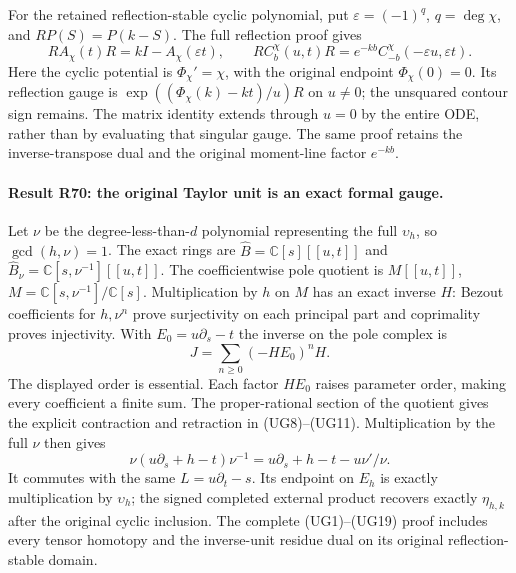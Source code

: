 For the retained reflection-stable cyclic polynomial, put
$\varepsilon=(-1)^q$, $q=\deg\chi$, and
$RP(S)=P(k-S)$. The full reflection proof gives
\[
RA_\chi(t)R=kI-A_\chi(\varepsilon t),\qquad
RC_b^\chi(u,t)R=e^{-kb}C_{-b}^\chi(-\varepsilon u,\varepsilon t).
\]
Here the cyclic potential is $\Phi_\chi'=\chi$, with the
original endpoint $\Phi_\chi(0)=0$. Its reflection gauge is
$\exp((\Phi_\chi(k)-kt)/u)R$ on $u\ne0$; the unsquared
contour sign remains. The matrix identity extends through
$u=0$ by the entire ODE, rather than by evaluating that
singular gauge. The same proof retains the inverse-transpose
dual and the original moment-line factor $e^{-kb}$.

\paragraph{Result R70: the original Taylor unit is an exact formal gauge.}
Let $\nu$ be the degree-less-than-$d$ polynomial representing
the full $\upsilon_h$, so $\gcd(h,\nu)=1$. The exact rings are
$\widehat B=\mathbb C[s][[u,t]]$ and
$\widehat B_\nu=\mathbb C[s,\nu^{-1}][[u,t]]$.
The coefficientwise pole quotient is
$M[[u,t]]$, $M=\mathbb C[s,\nu^{-1}]/\mathbb C[s]$.
Multiplication by $h$ on $M$ has an exact inverse $H$:
Bezout coefficients for $h,\nu^n$ prove surjectivity on each
principal part and coprimality proves injectivity.
With $E_0=u\partial_s-t$ the inverse on the pole complex is
\[
J=\sum_{n\ge0}(-HE_0)^nH.
\]
The displayed order is essential. Each factor $HE_0$ raises
parameter order, making every coefficient a finite sum.
The proper-rational section of the quotient gives the explicit
contraction and retraction in (UG8)--(UG11). Multiplication
by the full $\nu$ then gives
\[
\nu(u\partial_s+h-t)\nu^{-1}
=u\partial_s+h-t-u\nu'/\nu.
\]
It commutes with the same $L=u\partial_t-s$. Its endpoint
on $E_h$ is exactly multiplication by $\upsilon_h$; the
signed completed external product recovers exactly
$\eta_{h,k}$ after the original cyclic inclusion.
The complete (UG1)--(UG19) proof includes every tensor
homotopy and the inverse-unit residue dual on its original
reflection-stable domain.

